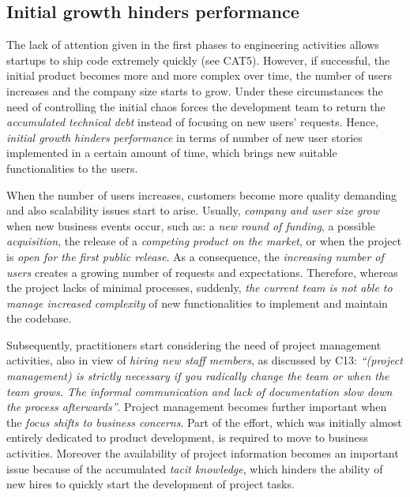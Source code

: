 \documentclass[10pt,journal,letterpaper,compsoc]{IEEEtran}
\begin{document}
\subsection{Initial growth hinders performance}\label{res:gsm:cat6} 
The lack of attention given in the first phases to engineering activities 
allows startups to ship code extremely quickly (see CAT5). However, if 
successful, the initial product becomes more and more complex over time, the 
number of users increases and the company size starts to grow. Under these 
circumstances the need of controlling the initial chaos forces the development 
team to return the \textit{accumulated technical debt} instead of focusing on 
new users' requests. Hence, \textit{initial growth hinders performance} in terms 
 of number of new user stories implemented in a certain amount of time, which 
brings new suitable functionalities to the users.

When the number of users increases, customers become more quality demanding and
also scalability issues start to arise. Usually, \textit{company and user size
grow} when new business events occur, such as: a \textit{new round of funding},
a possible \textit{acquisition}, the release of a \textit{competing product on
the market}, or when the project is \textit{open for the first public release}.
As a consequence, the \textit{increasing number of users} creates a growing
number of requests and expectations. Therefore, whereas the project lacks of
minimal processes, suddenly, \textit{the current team is not able to manage
increased complexity} of new functionalities to implement and maintain the
codebase.

Subsequently, practitioners start considering the need of project management
activities, also in view of \textit{hiring new staff members}, as discussed by
C13: \textit{``(project management) is strictly necessary if you radically
change the team or when the team grows. The informal communication and lack of
documentation slow down the process afterwards''}. Project management becomes
further important when the \textit{focus shifts to business concerns}. Part of
the effort, which was initially almost entirely dedicated to product
development, is required to move to business activities. Moreover the
availability of project information becomes an important issue because of the
accumulated \textit{tacit knowledge}, which hinders the ability of new hires to
quickly start the development of project tasks.
\end{document}
